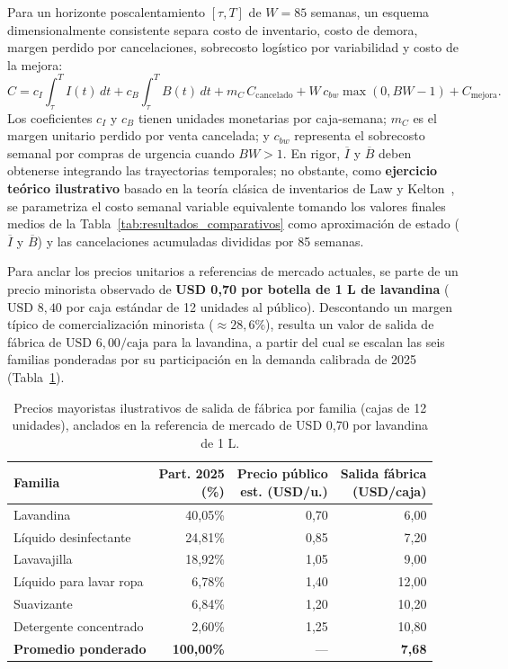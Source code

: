 \documentclass[11pt, a4paper]{article}
\begin{document}
Para un horizonte poscalentamiento $[\tau,T]$ de $W = 85$ semanas, un esquema dimensionalmente consistente separa costo de inventario, costo de demora, margen perdido por cancelaciones, sobrecosto logístico por variabilidad y costo de la mejora:
\begin{equation}
    C=c_I\int_{\tau}^{T}I(t)\,dt
      +c_B\int_{\tau}^{T}B(t)\,dt
      +m_C\,C_{\text{cancelado}}
      +W\,c_{bw}\max(0,BW-1)
      +C_{\text{mejora}}.
\end{equation}
Los coeficientes $c_I$ y $c_B$ tienen unidades monetarias por caja-semana; $m_C$ es el margen unitario perdido por venta cancelada; y $c_{bw}$ representa el sobrecosto semanal por compras de urgencia cuando $BW>1$. En rigor, $\overline{I}$ y $\overline{B}$ deben obtenerse integrando las trayectorias temporales; no obstante, como \textbf{ejercicio teórico ilustrativo} basado en la teoría clásica de inventarios de Law y Kelton~\cite{lawkelton,sterman}, se parametriza el costo semanal variable equivalente tomando los valores finales medios de la Tabla~\ref{tab:resultados_comparativos} como aproximación de estado ($\overline{I}$ y $\overline{B}$) y las cancelaciones acumuladas divididas por 85 semanas.

Para anclar los precios unitarios a referencias de mercado actuales, se parte de un precio minorista observado de \textbf{USD 0,70 por botella de 1 L de lavandina} ($\text{USD } 8{,}40$ por caja estándar de 12 unidades al público). Descontando un margen típico de comercialización minorista ($\approx 28{,}6\%$), resulta un valor de salida de fábrica de $\text{USD } 6{,}00/\text{caja}$ para la lavandina, a partir del cual se escalan las seis familias ponderadas por su participación en la demanda calibrada de 2025 (Tabla~\ref{tab:precios_mercado}).

\begin{table}[htbp]
\centering\small
\caption{Precios mayoristas ilustrativos de salida de fábrica por familia (cajas de 12 unidades), anclados en la referencia de mercado de USD 0,70 por lavandina de 1 L.}
\label{tab:precios_mercado}
\begin{tabularx}{\textwidth}{Xrrr}
\toprule
Familia & \shortstack[r]{Part. 2025\\(\%)} & \shortstack[r]{Precio público\\est. (USD/u.)} & \shortstack[r]{Salida fábrica\\(USD/caja)} \\
\midrule
Lavandina & 40,05\% & 0,70 & 6,00 \\
Líquido desinfectante & 24,81\% & 0,85 & 7,20 \\
Lavavajilla & 18,92\% & 1,05 & 9,00 \\
Líquido para lavar ropa & 6,78\% & 1,40 & 12,00 \\
Suavizante & 6,84\% & 1,20 & 10,20 \\
Detergente concentrado & 2,60\% & 1,25 & 10,80 \\
\midrule
\textbf{Promedio ponderado} & \textbf{100,00\%} & --- & \textbf{7,68} \\
\bottomrule
\end{tabularx}
\end{table}
\end{document}
